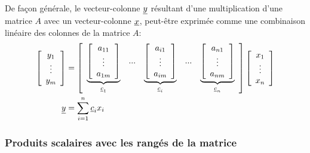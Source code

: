 De façon générale, le vecteur-colonne $\underline{y}$ résultant d'une multiplication d'une matrice $A$ avec un vecteur-colonne $\underline{x}$, peut-être exprimée comme une combinaison linéaire des colonnes de la matrice $A$:
\begin{align}
%
\left[ \begin{array}{c} 
	y_1 \\ \vdots \\ y_m
\end{array} \right] 
%
&= 
%
\left[ \begin{array}{c c c c c} 
\underbrace{\left[ \begin{array}{c} 
	a_{11} \\ \vdots \\ a_{1m}
\end{array} \right]}_{\col{c}_1}
& ... &
\underbrace{\left[ \begin{array}{c} 
	a_{i1} \\ \vdots \\ a_{im}
\end{array} \right]}_{\col{c}_i}
& ... &
\underbrace{\left[ \begin{array}{c} 
	a_{n1} \\ \vdots \\ a_{nm}
\end{array} \right]}_{\col{c}_n}
\end{array} \right] 
%
\left[ \begin{array}{c} 
	x_1 \\ \vdots \\ x_n
\end{array} \right]  \\
%
%
\col{y}
&= \sum_{i=1}^{n}{ \col{c}_i x_i}
\end{align}

\subsubsection{Produits scalaires avec les rangés de la matrice} 
\label{sec:combveccol}

